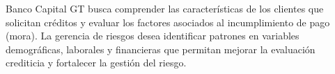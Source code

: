 Banco Capital GT busca comprender las características de los clientes que solicitan créditos y evaluar los factores asociados al incumplimiento de pago (mora). La gerencia de riesgos desea identificar patrones en variables demográficas, laborales y financieras que permitan mejorar la evaluación crediticia y fortalecer la gestión del riesgo.